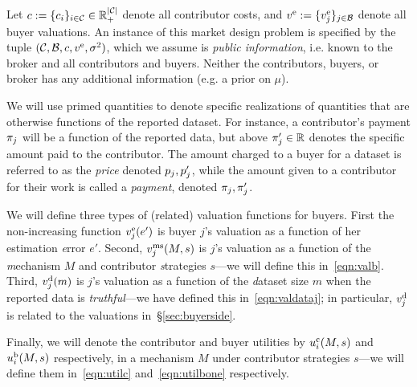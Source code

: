 Let  $c := \{c_i\}_{i \in \mathcal{C}} \in \mathbb{R}_+^{|\mathcal{C}|}$ denote all contributor costs, and $v^{\rm e} := \{v^{\rm e}_{j}\}_{j \in \mathcal{B}}$ denote all buyer valuations.
An instance of this market design problem is specified by the tuple $(\mathcal{C}, \mathcal{B}, c, v^{\rm e}, \sigma^2)$,  which we assume is \emph{public information},
i.e. known to the broker and all contributors and buyers.
Neither the contributors, buyers, or broker has any additional information (e.g. a prior on $\mu$).



We will use primed quantities to denote specific realizations of quantities that are otherwise functions of the reported dataset.
For instance, a contributor's payment $\pi_j$ will be a function of the reported data, but above $\pi_j'\in\mathbb{R}$ denotes the specific amount paid to the contributor.
The amount charged to a buyer for a dataset is referred to as the \emph{price} denoted $p_j,p_j'$, while the amount given to a contributor for their work is called a \emph{payment}, denoted $\pi_j, \pi_j'$.

We will define three types of (related) valuation functions for buyers.
First the non-increasing function $v^{\rm e}_{j}(e')$ is buyer $j$'s valuation as a function of her estimation \emph{e}rror $e'$.
Second, $v^{\rm ms}_{j}(M,s)$ is $j$'s valuation as a function of the \emph{m}echanism $M$ and contributor \emph{s}trategies $s$---we will define this in~\eqref{eqn:valb}.
Third, $v^{\rm d}_{j}(m)$ is $j$'s valuation as a function of the \emph{d}ataset size $m$ when the reported data is \emph{truthful}---we have defined this in~\eqref{eqn:valdataj};
in particular, $v^{\rm d}_{j}$ is related to the valuations in~\S\ref{sec:buyerside}.

Finally, we will denote the contributor and buyer utilities by $u^{\rm c}_{i}(M, s)$ and $u^{\rm b}_{i}(M,s)$ 
respectively, in a mechanism $M$ under contributor strategies $s$---we will define them in~\eqref{eqn:utilc} and~\eqref{eqn:utilbone} respectively.




